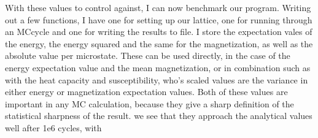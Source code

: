 \documentclass[10pt, twocolumn]{revtex4-1}
\begin{document}
With these values to control against, I can now benchmark our program. Writing out a few functions, I have one for setting up our lattice, one for running
through an MCcycle and one for writing the results to file. I store the expectation vales of the energy, the energy squared and the same for the magnetization,
as well as the absolute value per microstate. These can be used directly, in the case of the energy expectation value and the mean magnetization, or in
combination such as with the heat capacity and susceptibility, who's scaled values are the variance in either energy or magnetization expectation values. Both
of these values are important in any MC calculation, because they give a sharp definition of the statistical sharpness of the result.
we see that they approach the analytical values well after 1e6 cycles, with %
\end{document}

